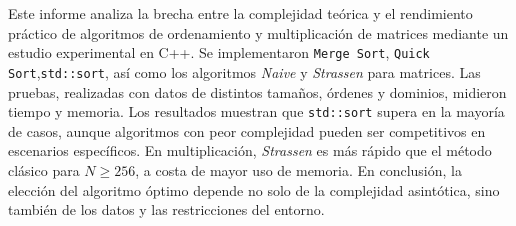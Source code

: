 Este informe analiza la brecha entre la complejidad teórica y el rendimiento práctico de algoritmos de ordenamiento y multiplicación de matrices mediante un estudio experimental en C++. Se implementaron \texttt{Merge Sort}, \texttt{Quick Sort},\texttt{std::sort}, así como los algoritmos \textit{Naive} y \textit{Strassen} para matrices. Las pruebas, realizadas con datos de distintos tamaños, órdenes y dominios, midieron tiempo y memoria. Los resultados muestran que \texttt{std::sort} supera en la mayoría de casos, aunque algoritmos con peor complejidad pueden ser competitivos en escenarios específicos. En multiplicación, \textit{Strassen} es más rápido que el método clásico para $N \geq 256$, a costa de mayor uso de memoria. En conclusión, la elección del algoritmo óptimo depende no solo de la complejidad asintótica, sino también de los datos y las restricciones del entorno.